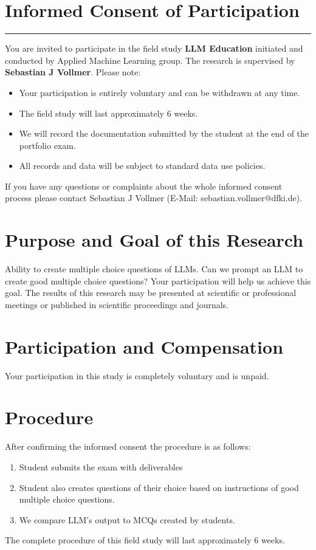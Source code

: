 \newpage
\section*{Informed Consent of Participation}

\hrule
\medskip
You are invited to participate in the field study \textbf{LLM Education} initiated and conducted by Applied Machine Learning group. The research is supervised by \textbf{Sebastian J Vollmer}. Please note:

\begin{itemize}
    \item Your participation is entirely voluntary and can be withdrawn at any time.
    \item The field study will last approximately 6 weeks.
    \item We will record the documentation submitted by the student at the end of the portfolio exam.
    \item All records and data will be subject to standard data use policies.
\end{itemize}

If you have any questions or complaints about the whole informed consent process please contact Sebastian J Vollmer (E-Mail: sebastian.vollmer@dfki.de). 

\section*{Purpose and Goal of this Research}
Ability to create multiple choice questions of LLMs. Can we prompt an LLM to create good multiple choice questions? Your participation will help us achieve this goal. The results of this research may be presented at scientific or professional meetings or published in scientific proceedings and journals.

\section*{Participation and Compensation}
Your participation in this study is completely voluntary and is unpaid.

\section*{Procedure}
After confirming the informed consent the procedure is as follows:

\begin{enumerate}
    \item Student submits the exam with deliverables 
    \item Student also creates questions of their choice based on instructions of good multiple choice questions.
    \item We compare LLM's output to MCQs created by students. 
\end{enumerate}
The complete procedure of this field study will last approximately 6 weeks.

